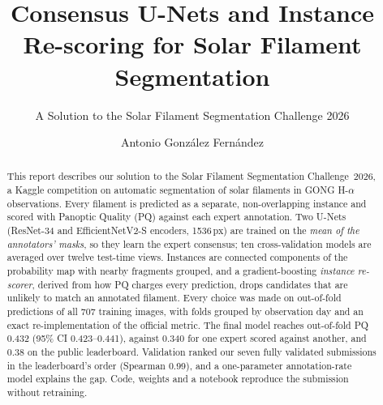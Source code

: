\documentclass[sigconf]{acmart}
\begin{document}
\title{Consensus U-Nets and Instance Re-scoring for Solar Filament Segmentation}  %
\subtitle{A Solution to the Solar Filament Segmentation Challenge 2026} %


\author{Antonio Gonz\'alez Fern\'andez}  %

\begin{abstract}
    This report describes our solution to the Solar Filament Segmentation Challenge~2026, a Kaggle competition on automatic segmentation of solar filaments in GONG H-$\alpha$ observations.
Every filament is predicted as a separate, non-overlapping instance and scored with Panoptic Quality (PQ) against each
expert annotation. Two U-Nets (ResNet-34 and EfficientNetV2-S encoders, 1536\,px) are
trained on the \emph{mean of the annotators' masks}, so they learn the expert consensus; ten cross-validation models are
averaged over twelve test-time views. Instances are connected components of the probability map with nearby fragments
grouped, and a gradient-boosting \emph{instance re-scorer}, derived from how PQ charges every prediction, drops candidates
that are unlikely to match an annotated filament. Every choice was made on out-of-fold predictions of all 707 training
images, with folds grouped by observation day and an exact re-implementation of the official metric. The final model
reaches out-of-fold PQ 0.432 (95\% CI 0.423--0.441), against 0.340 for one expert scored against another, and 0.38 on the
public leaderboard. Validation ranked our seven fully validated submissions in the leaderboard's order (Spearman 0.99),
and a one-parameter annotation-rate model explains the gap. Code, weights and a notebook reproduce the submission
without retraining.
\end{abstract}

\maketitle

\end{document}
